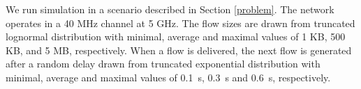 We run simulation in a scenario described in Section \ref{problem}.
The network operates in a 40 MHz channel at 5 GHz.
The flow sizes are drawn from truncated lognormal distribution with minimal, average and maximal values of 1 KB, 500 KB, and 5 MB, respectively. When a flow is delivered, the next flow is generated after a random delay drawn from truncated exponential distribution with minimal, average and maximal values of \SI{0.1}{\s}, \SI{0.3}{\s} and \SI{0.6}{\s}, respectively.



